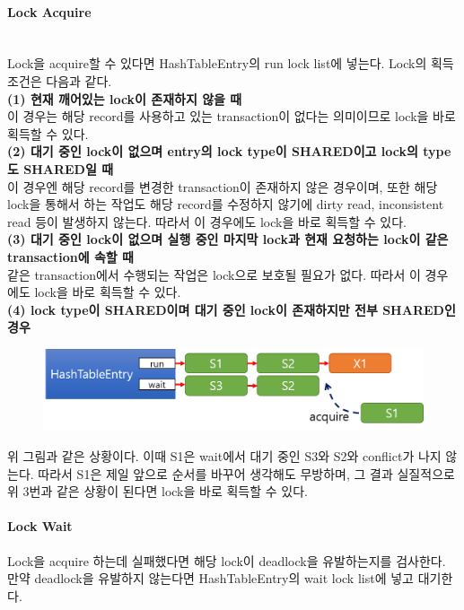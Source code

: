\documentclass[main.tex]{subfiles}
\begin{document}
\paragraph{Lock Acquire}\mbox{}\\
Lock을 acquire할 수 있다면 HashTableEntry의 run lock list에 넣는다. Lock의 획득 조건은 다음과 같다.\mbox{}\\

\noindent \textbf{(1) 현재 깨어있는 lock이 존재하지 않을 때}\\
\indent 이 경우는 해당 record를 사용하고 있는 transaction이 없다는 의미이므로 lock을 바로 획득할 수 있다.
\mbox{}\\

\noindent \textbf{(2) 대기 중인 lock이 없으며 entry의 lock type이 SHARED이고 lock의 type도 SHARED일 때}\\
\indent 이 경우엔 해당 record를 변경한 transaction이 존재하지 않은 경우이며, 또한 해당 lock을 통해서 하는 작업도 해당 record를 수정하지 않기에 dirty read, inconsistent read 등이 발생하지 않는다. 따라서 이 경우에도 lock을 바로 획득할 수 있다.
\mbox{}\\

\noindent \textbf{(3) 대기 중인 lock이 없으며 실행 중인 마지막 lock과 현재 요청하는 lock이 같은 transaction에 속할 때}\\
\indent 같은 transaction에서 수행되는 작업은 lock으로 보호될 필요가 없다. 따라서 이 경우에도 lock을 바로 획득할 수 있다.
\mbox{}\\

\noindent \textbf{(4) lock type이 SHARED이며 대기 중인 lock이 존재하지만 전부 SHARED인 경우}\\
\begin{figure}[!hbt]
	\centering
	\includegraphics[width=.8\textwidth]{images/cc/lock_acquire_4.png}
\end{figure}

\indent 위 그림과 같은 상황이다. 이때 S1은 wait에서 대기 중인 S3와 S2와 conflict가 나지 않는다. 따라서 S1은 제일 앞으로 순서를 바꾸어 생각해도 무방하며, 그 결과 실질적으로 위 3번과 같은 상황이 된다면 lock을 바로 획득할 수 있다.

\paragraph{Lock Wait}
Lock을 acquire 하는데 실패했다면 해당 lock이 deadlock을 유발하는지를 검사한다. 만약 deadlock을 유발하지 않는다면 HashTableEntry의 wait lock list에 넣고 대기한다.
\end{document}
